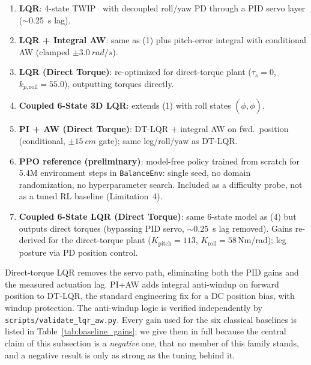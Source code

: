\documentclass[conference]{IEEEtran}
\begin{document}
\begin{enumerate}
\item \textbf{LQR}: 4-state TWIP~\cite{grasser2002joe,pathak2005wip} with decoupled roll/yaw PD through a PID servo layer ($\sim$\SI{0.25}{s} lag).
\item \textbf{LQR + Integral AW}: same as (1) plus pitch-error integral with conditional AW (clamped $\pm\SI{3.0}{rad/s}$).
\item \textbf{LQR (Direct Torque)}: re-optimized for direct-torque plant ($\tau_s{=}0$, $k_{p,\text{roll}}{=}55.0$), outputting torques directly.
\item \textbf{Coupled 6-State 3D LQR}: extends (1) with roll states $(\phi,\dot{\phi})$.
\item \textbf{PI + AW (Direct Torque)}: DT-LQR $+$ integral AW on fwd.\ position (conditional, $\pm\SI{15}{cm}$ gate); same leg/roll/yaw as DT-LQR.
\item \textbf{PPO reference (preliminary)}: model-free policy trained from scratch for \num{5.4}M environment steps in \texttt{BalanceEnv}: single seed, no domain randomization, no hyperparameter search. Included as a difficulty probe, not as a tuned RL baseline (Limitation~4).
\item \textbf{Coupled 6-State LQR (Direct Torque)}: same 6-state model as (4) but outputs direct torques (bypassing PID servo, $\sim$\SI{0.25}{s} lag removed). Gains re-derived for the direct-torque plant ($K_{\text{pitch}}{=}113$, $K_{\text{roll}}{=}58$\,Nm/rad); leg posture via PD position control.
\end{enumerate}

Direct-torque LQR removes the servo path, eliminating both the PID gains and the measured actuation lag. PI+AW adds integral anti-windup on forward position to DT-LQR, the standard engineering fix for a DC position bias, with windup protection. The anti-windup logic is verified independently by \texttt{scripts/validate\_lqr\_aw.py}. Every gain used for the six classical baselines is listed in Table~\ref{tab:baseline_gains}; we give them in full because the central claim of this subsection is a \emph{negative} one, that no member of this family stands, and a negative result is only as strong as the tuning behind it.
\end{document}
